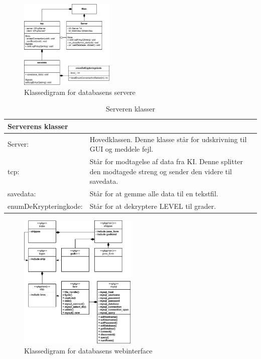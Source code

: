 \begin{figure}[htbp]
	\centering
	\includegraphics[width=0.4\textwidth]{billeder/Database/serverKlassediagram}
	\caption{Klassedigram for databasens servere}
	\label{fig:serverKlassediagram}
\end{figure}

\begin{table}[H]
\centering
{}
\begin{tabular}{| p{3cm}  p{12.5cm}|}
\multicolumn{2}{l}{{\Large Serverens klasser}} \\\hline
Server:&Hovedklassen. Denne klasse står for udskrivning til GUI og meddele fejl.\\\hline
tcp:& Står for modtagelse af data fra KI. Denne splitter den modtagede streng og sender den videre til savedata.\\\hline
savedata: & Står for at gemme alle data til en tekstfil.\\\hline
enumDeKrypteringkode:& Står for at dekryptere LEVEL til grader.\\\hline
\end{tabular}
\caption{Serveren klasser}
\label{tabel:server-klasser}
\end{table}

\begin{figure}[H]
	\centering
	\includegraphics[width=0.5\textwidth]{billeder/Database/web_klasse}
	\caption{Klassedigram for databasens webinterface}
	\label{fig:serverKlassediagram}
\end{figure}

